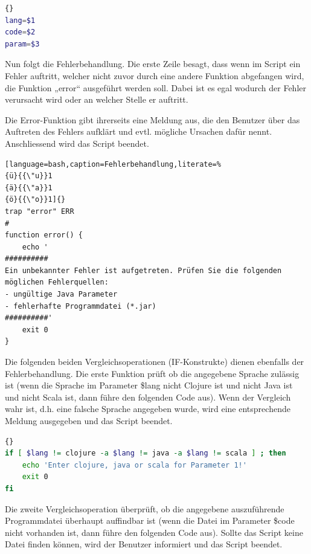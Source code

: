 \documentclass{fancydocument}
\begin{document}
\begin{minipage}{\textwidth}
\begin{lstlisting}[language=bash,caption=Parameter]{}
lang=$1
code=$2
param=$3
\end{lstlisting}
\end{minipage}

Nun folgt die Fehlerbehandlung.  Die erste Zeile besagt, dass wenn im Script ein Fehler auftritt, welcher nicht zuvor durch eine andere Funktion abgefangen wird, die Funktion „error“ ausgeführt werden soll. Dabei ist es egal wodurch der Fehler verursacht wird oder an welcher Stelle er auftritt.

Die Error-Funktion gibt ihrerseits eine Meldung aus, die den Benutzer über das Auftreten des Fehlers aufklärt und evtl. mögliche Ursachen dafür nennt. Anschliessend wird das Script beendet.

\begin{minipage}{\textwidth}
\begin{lstlisting}[language=bash,caption=Fehlerbehandlung,literate=% 
{ü}{{\"u}}1 
{ä}{{\"a}}1 
{ö}{{\"o}}1]{}
trap "error" ERR
#
function error() {
	echo '
##########
Ein unbekannter Fehler ist aufgetreten. Prüfen Sie die folgenden möglichen Fehlerquellen:
- ungültige Java Parameter
- fehlerhafte Programmdatei (*.jar)
##########'
	exit 0
}
\end{lstlisting}
\end{minipage}

Die folgenden beiden Vergleichsoperationen (IF-Konstrukte) dienen ebenfalls der Fehlerbehandlung. Die erste Funktion prüft ob die angegebene Sprache zulässig ist (wenn die Sprache im Parameter \$lang nicht Clojure ist und nicht Java ist und nicht Scala ist, dann führe den folgenden Code aus). Wenn der Vergleich wahr ist, d.h. eine falsche Sprache angegeben wurde, wird eine entsprechende Meldung ausgegeben und das Script beendet.

\begin{minipage}{\textwidth}
\begin{lstlisting}[language=bash,caption=Sprachparameter prüfen]{}
if [ $lang != clojure -a $lang != java -a $lang != scala ] ; then
	echo 'Enter clojure, java or scala for Parameter 1!'
	exit 0
fi
\end{lstlisting}
\end{minipage}

Die zweite Vergleichsoperation überprüft, ob die angegebene auszuführende Programmdatei überhaupt auffindbar ist (wenn die Datei im Parameter \$code nicht vorhanden ist, dann führe den folgenden Code aus). Sollte das Script keine Datei finden können, wird der Benutzer informiert und das Script beendet.
\end{document}
